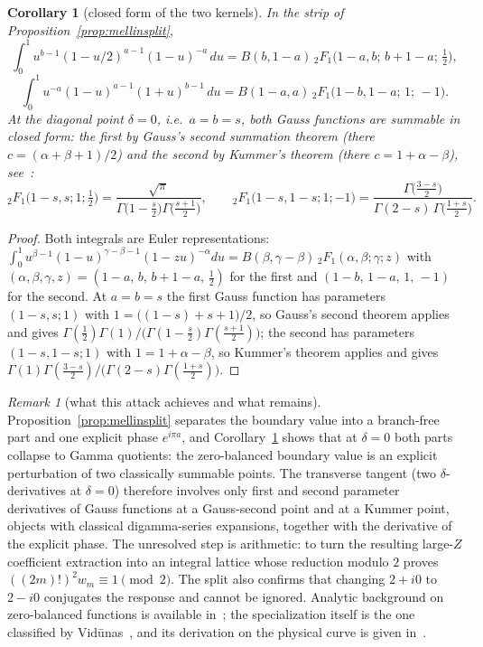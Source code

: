 \documentclass[12pt]{amsart}
\newtheorem{corollary}[theorem]{Corollary}
\theoremstyle{definition}
\theoremstyle{remark}
\newtheorem{remark}[theorem]{Remark}
\begin{document}
\begin{corollary}[closed form of the two kernels]\label{cor:kernels}
In the strip of Proposition~\ref{prop:mellinsplit},
\[
 \int_0^1u^{b-1}(1-u/2)^{a-1}(1-u)^{-a}\,du
 =B(b,1-a)\,{}_2F_1\bigl(1-a,b;\,b+1-a;\,\tfrac12\bigr),
\]
\[
 \int_0^1u^{-a}(1-u)^{a-1}(1+u)^{b-1}\,du
 =B(1-a,a)\,{}_2F_1\bigl(1-b,1-a;\,1;\,-1\bigr).
\]
At the diagonal point $\delta=0$, i.e.\ $a=b=s$, both Gauss functions are summable in closed form: the first by Gauss's second summation theorem (there $c=(\alpha+\beta+1)/2$) and the second by Kummer's theorem (there $c=1+\alpha-\beta$), see~\cite[Sec.~3.1]{AndrewsAskeyRoy}:
\[
 {}_2F_1\bigl(1-s,s;1;\tfrac12\bigr)
 =\frac{\sqrt\pi}{\Gamma\bigl(1-\frac s2\bigr)
                    \Gamma\bigl(\frac{s+1}2\bigr)},
 \qquad
 {}_2F_1\bigl(1-s,1-s;1;-1\bigr)
 =\frac{\Gamma\bigl(\frac{3-s}2\bigr)}
        {\Gamma(2-s)\,\Gamma\bigl(\frac{1+s}2\bigr)} .
\]
\end{corollary}

\begin{proof}
Both integrals are Euler representations: $\int_0^1u^{\beta-1}(1-u)^{\gamma-\beta-1}(1-zu)^{-\alpha}du =B(\beta,\gamma-\beta)\,{}_2F_1(\alpha,\beta;\gamma;z)$ with $(\alpha,\beta,\gamma,z)=(1-a,\,b,\,b+1-a,\,\tfrac12)$ for the first and $(1-b,\,1-a,\,1,\,-1)$ for the second.  At $a=b=s$ the first Gauss function has parameters $(1-s,s;1)$ with $1=\bigl((1-s)+s+1\bigr)/2$, so Gauss's second theorem applies and gives $\Gamma(\tfrac12)\Gamma(1)/\bigl(\Gamma(1-\tfrac s2) \Gamma(\tfrac{s+1}2)\bigr)$; the second has parameters $(1-s,1-s;1)$ with $1=1+\alpha-\beta$, so Kummer's theorem applies and gives $\Gamma(1)\Gamma(\tfrac{3-s}2)/\bigl(\Gamma(2-s)\Gamma(\tfrac{1+s}2)\bigr)$.
\end{proof}

\begin{remark}[what this attack achieves and what remains]
Proposition~\ref{prop:mellinsplit} separates the boundary value into a branch-free part and one explicit phase $e^{i\pi a}$, and Corollary~\ref{cor:kernels} shows that at $\delta=0$ both parts collapse to Gamma quotients: the zero-balanced boundary value is an explicit perturbation of two classically summable points.  The transverse tangent (two $\delta$-derivatives at $\delta=0$) therefore involves only first and second parameter derivatives of Gauss functions at a
Gauss-second point and at a Kummer point, objects with classical digamma-series expansions, together with the derivative of the explicit phase.  The unresolved step is arithmetic: to turn the resulting large-$Z$ coefficient extraction into an integral lattice whose reduction modulo $2$ proves $((2m)!)^2w_m\equiv1\pmod2$.  The split also confirms that changing $2+i0$ to $2-i0$ conjugates the response and cannot be ignored.  Analytic background on zero-balanced functions is available in~\cite{AndersonEtAl,SimicVuorinen}; the specialization itself is the one classified by Vid\=unas~\cite{VidunasAppell}, and its derivation on the physical curve is given in~\cite{Ultraspherical}.
\end{remark}
\end{document}
